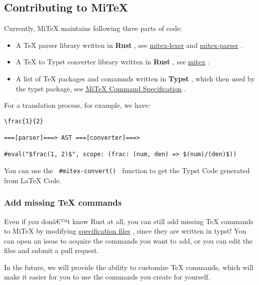 \subsection{Contributing to MiTeX}\label{contributing-to-mitex}

Currently, MiTeX maintains following three parts of code:

\begin{itemize}
\tightlist
\item
  A TeX parser library written in \textbf{Rust} , see
  \href{https://github.com/mitex-rs/mitex/tree/main/crates/mitex-lexer}{mitex-lexer}
  and
  \href{https://github.com/mitex-rs/mitex/tree/main/crates/mitex-parser}{mitex-parser}
  .
\item
  A TeX to Typst converter library written in \textbf{Rust} , see
  \href{https://github.com/mitex-rs/mitex/tree/main/crates/mitex}{mitex}
  .
\item
  A list of TeX packages and comamnds written in \textbf{Typst} , which
  then used by the typst package, see
  \href{https://github.com/mitex-rs/mitex/tree/main/packages/mitex/specs}{MiTeX
  Command Specification} .
\end{itemize}

For a translation process, for example, we have:

\begin{verbatim}
\frac{1}{2}

===[parser]===> AST ===[converter]===>

#eval("$frac(1, 2)$", scope: (frac: (num, den) => $(num)/(den)$))
\end{verbatim}

You can use the \texttt{\ \#mitex-convert()\ } function to get the Typst
Code generated from LaTeX Code.

\subsubsection{Add missing TeX commands}\label{add-missing-tex-commands}

Even if you donâ€™t know Rust at all, you can still add missing TeX
commands to MiTeX by modifying
\href{https://github.com/mitex-rs/mitex/tree/main/packages/mitex/specs}{specification
files} , since they are written in typst! You can open an issue to
acquire the commands you want to add, or you can edit the files and
submit a pull request.

In the future, we will provide the ability to customize TeX commands,
which will make it easier for you to use the commands you create for
yourself.

